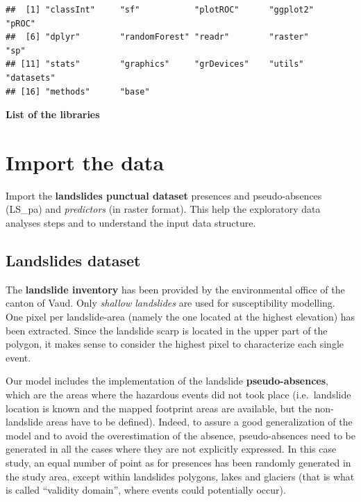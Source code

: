 \documentclass[
]{book}
\begin{document}
\begin{verbatim}
##  [1] "classInt"     "sf"           "plotROC"      "ggplot2"      "pROC"        
##  [6] "dplyr"        "randomForest" "readr"        "raster"       "sp"          
## [11] "stats"        "graphics"     "grDevices"    "utils"        "datasets"    
## [16] "methods"      "base"
\end{verbatim}

\textbf{List of the libraries}

\hypertarget{import-the-data-1}{%
\section{Import the data}\label{import-the-data-1}}

Import the \textbf{landslides punctual dataset} presences and pseudo-absences (LS\_pa) and \emph{predictors} (in raster format).
This help the exploratory data analyses steps and to understand the input data structure.

\hypertarget{landslides-dataset}{%
\subsection{Landslides dataset}\label{landslides-dataset}}

The \textbf{landslide inventory} has been provided by the environmental office of the canton of Vaud.
Only \emph{shallow landslides} are used for susceptibility modelling.
One pixel per landslide-area (namely the one located at the highest elevation) has been extracted.
Since the landslide scarp is located in the upper part of the polygon, it makes sense to consider the highest pixel to characterize each single event.

Our model includes the implementation of the landslide \textbf{pseudo-absences}, which are the areas where the hazardous events did not took place (i.e.~landslide location is known and the mapped footprint areas are available, but the non-landslide areas have to be defined).
Indeed, to assure a good generalization of the model and to avoid the overestimation of the absence, pseudo-absences need to be generated in all the cases where they are not explicitly expressed.
In this case study, an equal number of point as for presences has been randomly generated in the study area, except within landslides polygons, lakes and glaciers (that is what is called ``validity domain'', where events could potentially occur).
\end{document}
